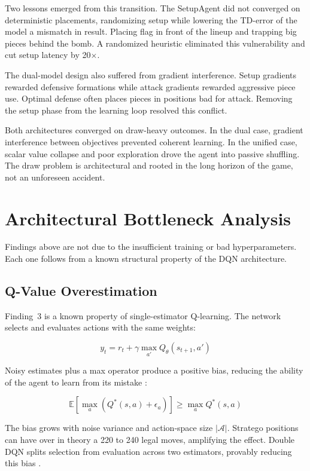 Two lessons emerged from this transition. The SetupAgent did not converged on deterministic placements, randomizing setup while lowering the TD-error of the model a mismatch in result. Placing flag in front of the lineup and trapping big pieces behind the bomb. A randomized heuristic eliminated this vulnerability and cut setup latency by 20$\times$.

The dual-model design also suffered from gradient interference. Setup gradients rewarded defensive formations while attack gradients rewarded aggressive piece use. Optimal defense often places pieces in positions bad for attack. Removing the setup phase from the learning loop resolved this conflict.

Both architectures converged on draw-heavy outcomes. In the dual case, gradient interference between objectives prevented coherent learning. In the unified case, scalar value collapse and poor exploration drove the agent into passive shuffling. The draw problem is architectural and rooted in the long horizon of the game, not an unforeseen accident.


\section{Architectural Bottleneck Analysis}

Findings above are not due to the insufficient training or bad hyperparameters. Each one follows from a known structural property of the DQN architecture.

\subsection{Q-Value Overestimation}

Finding~3 is a known property of single-estimator Q-learning. The network selects and evaluates actions with the same weights:

\begin{equation}
y_t = r_t + \gamma \max_{a'} Q_\theta(s_{t+1}, a')
\end{equation}

Noisy estimates plus a max operator produce a positive bias, reducing the ability of the agent to learn from its mistake \cite{RainbowJMLR2021}:

\begin{equation}
\mathbb{E}\left[\max_{a} (Q^*(s, a) + \epsilon_a)\right] \geq \max_{a} Q^*(s, a)
\end{equation}

The bias grows with noise variance and action-space size $|\mathcal{A}|$. Stratego positions can have over in theory a 220 to 240 legal moves, amplifying the effect. Double DQN splits selection from evaluation across two estimators, provably reducing this bias \cite{RainbowJMLR2021}.

